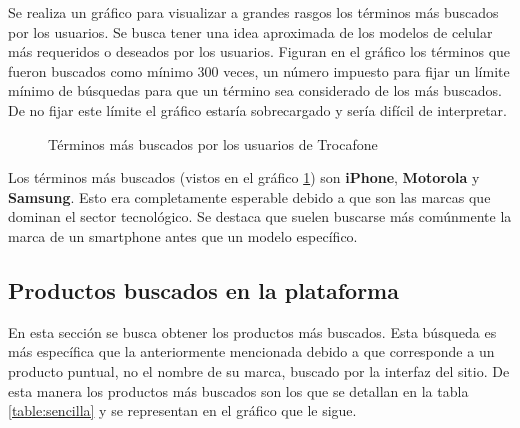 \documentclass[a4paper]{article}
\begin{document}
Se realiza un gráfico para visualizar a grandes rasgos los términos más buscados por los usuarios. Se busca tener una idea aproximada de los modelos de celular más requeridos o deseados por los usuarios. Figuran en el gráfico los términos que fueron buscados como mínimo 300 veces, un número impuesto para fijar un límite mínimo de búsquedas para que un término sea considerado de los más buscados. De no fijar este límite el gráfico estaría sobrecargado y sería difícil de interpretar.

\begin{figure}[!h]
	\caption{Términos más buscados por los usuarios de Trocafone}
	\label{fig:searchedterm}
\end{figure}

Los términos más buscados (vistos en el gráfico \ref{fig:searchedterm}) son \textbf{iPhone}, \textbf{Motorola} y \textbf{Samsung}. Esto era completamente esperable debido a que son las marcas que dominan el sector tecnológico. Se destaca que suelen buscarse más comúnmente la marca de un smartphone antes que un modelo específico.

\subsection{Productos buscados en la plataforma}

En esta sección se busca obtener los productos más buscados. Esta búsqueda es más específica que la anteriormente mencionada debido a que corresponde a un producto puntual, no el nombre de su marca, buscado por la interfaz del sitio. De esta manera los productos más buscados son los que se detallan en la tabla \ref{table:sencilla} y se representan en el gráfico que le sigue.
\end{document}
